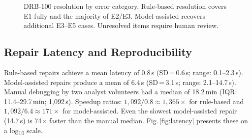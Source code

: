 \documentclass[conference]{IEEEtran}
\begin{document}
\begin{figure}[t]
\centering
{}
\caption{DRB-100 resolution by error category. Rule-based resolution
  covers E1 fully and the majority of E2/E3. Model-assisted recovers
  additional E3--E5 cases. Unresolved items require human review.}
\label{fig:repair}
\end{figure}

\subsection{Repair Latency and Reproducibility}

Rule-based repairs achieve a mean latency of 0.8\,s (SD\,=\,0.6\,s;
range: 0.1--2.3\,s). Model-assisted repairs produce a mean of 6.4\,s
(SD\,=\,3.1\,s; range: 2.1--14.7\,s). Manual debugging by two analyst
volunteers had a median of 18.2\,min (IQR: 11.4--29.7\,min; 1{,}092\,s).
Speedup ratios: $1{,}092/0.8\approx1{,}365\times$ for rule-based and
$1{,}092/6.4\approx171\times$ for model-assisted. Even the slowest
model-assisted repair (14.7\,s) is 74$\times$ faster than the manual
median. Fig.\,\ref{fig:latency} presents these on a
log\textsubscript{10} scale.
\end{document}
